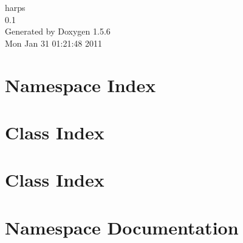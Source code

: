 \documentclass[a4paper]{book}
\begin{document}
\begin{titlepage}
\vspace*{7cm}
\begin{center}
{\Large harps \\[1ex]\large 0.1 }\\
\vspace*{1cm}
{\large Generated by Doxygen 1.5.6}\\
\vspace*{0.5cm}
{\small Mon Jan 31 01:21:48 2011}\\
\end{center}
\end{titlepage}
\clearemptydoublepage
{}
\tableofcontents
\clearemptydoublepage
{}
\chapter{Namespace Index}

\chapter{Class Index}

\chapter{Class Index}

\chapter{Namespace Documentation}




\end{document}
